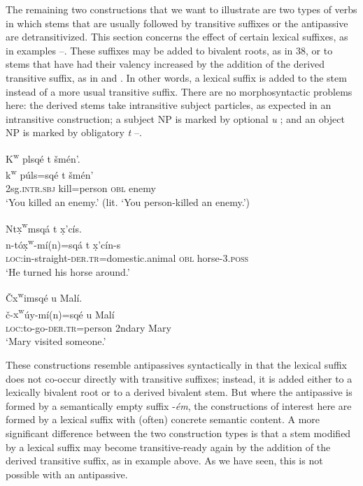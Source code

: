 \documentclass[output=paper,colorlinks,citecolor=brown]{langscibook}
\begin{document}
The remaining two constructions that we want to illustrate are two
types of verbs in which stems that are usually followed by transitive
suffixes or the antipassive are detransitivized.  This section
concerns the effect of certain lexical suffixes, as in examples --.
These suffixes may be added to bivalent roots, as in 38, or to stems
that have had their valency increased by the addition of the derived
transitive suffix, as in  and .  In other words, a lexical suffix
is added to the stem instead of a more usual transitive suffix.  There
are no morphosyntactic problems here: the derived stems take
intransitive subject particles, as expected in an intransitive
construction; a subject NP is marked by optional \emph{{\textltilde}u}
; and an object NP is marked by obligatory \emph{t} --.

\ea 
\label{ex-thomason-38}
{K\textsuperscript w} plsq\'e t \v{s}m\'en'. \\
\gll  k\textsuperscript w p\'uls=sq\'e t \v{s}m\'en' \\
2sg.\textsc{intr.sbj} kill=person \textsc{obl} enemy \\
\glt `You killed an enemy.' (lit. `You person-killed an enemy.')
\z

\ea 
\label{ex-thomason-39}
Nt{\d{x}\textsuperscript w}msq\'a t \d{x}{\textcrlambda}'c\'is. \\
\gll n-t\'o{\d{x}\textsuperscript w}-m\'i(n)=sq\'a t
 \d{x}{\textcrlambda}'c\'in-s \\
\textsc{loc}:in-straight-\textsc{der.tr}=domestic.animal \textsc{obl} horse-3.\textsc{poss} \\
\glt `He turned his horse around.'
\z

\ea  
\label{ex-thomason-40}
{\v{C}{x\textsuperscript w}imsq\'e {\textltilde}u Mal\'i.} \\
\gll \v{c}-{x\textsuperscript w}\'uy-m\'i(n)=sq\'e {\textltilde}u Mal\'i \\
\textsc{loc}:to-go-\textsc{der.tr}=person 2ndary Mary \\
\glt `Mary visited someone.'
\z

These constructions resemble antipassives syntactically in that the
lexical suffix does not co-occur directly with transitive suffixes;
instead, it is added either to a lexically bivalent root or to a
derived bivalent stem.  But where the antipassive is formed by a
semantically empty suffix -\emph{\'em}, the constructions of interest
here are formed by a lexical suffix with (often) concrete semantic
content.  A more significant difference between the two construction
types is that a stem modified by a lexical suffix may become
transitive-ready again by the addition of the derived transitive
suffix, as in example  above.  As we have seen, this is not possible
with an antipassive.
\end{document}
